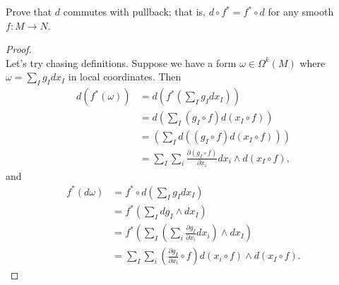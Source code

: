 \documentclass{article}
\newenvironment{problem}[2][Problem]{\begin{trivlist}
\item[\hskip \labelsep {\bfseries #1}\hskip \labelsep {\bfseries #2.}]}{\end{trivlist}}
\begin{document}
\pagebreak

\begin{problem}{6}
  Prove that $d$ commutes with pullback; that is, $d \circ f^* = f^* \circ d$
  for any smooth $f\colon M \rightarrow N$.
\end{problem}

\begin{proof} \text{} \\
  Let's try chasing definitions. Suppose we have a form $\omega \in \Omega^k(M)$
  where $\omega = \sum_I g_I dx_I$ in local coordinates. Then \begin{align*}
    d(f^*(\omega))
      &= d\left(f^*\left(\sum_I g_I dx_I\right)\right) \\
      &= d\left(\sum_I (g_I \circ f) d(x_I \circ f)\right) \\
      &= \left(\sum_I d((g_I \circ f) d(x_I \circ f))\right) \\
      &= \sum_I\sum_i \frac{\partial(g_I \circ f)}{\partial x_i} dx_i \wedge d(x_I \circ f),
  \end{align*}
  and \begin{align*}
    f^*(d\omega)
      &= f^*\circ d\left(\sum_I g_I dx_I\right) \\
      &= f^*\left(\sum_I dg_I \wedge dx_I\right) \\
      &= f^*\left(\sum_I \left(\sum_i \frac{\partial g_I}{\partial x_i}dx_i\right) \wedge dx_I\right) \\
      &= \sum_I \sum_i \left(\frac{\partial g_I}{\partial x_i} \circ f\right)d(x_i \circ f) \wedge d(x_I \circ f).
  \end{align*}
\end{proof}
\end{document}
